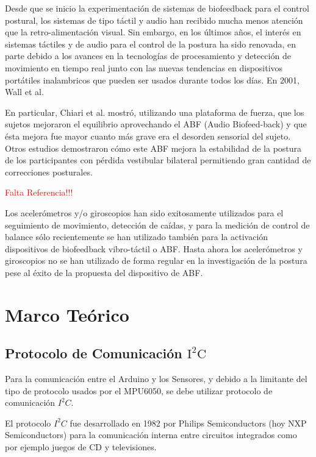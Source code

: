 \documentclass[12pt,a4paper]{article}
\begin{document}
Desde que se inicio la experimentación de sistemas de biofeedback para el control postural, los sistemas de tipo táctil y audio han recibido mucha menos atención que la retro-alimentación visual.
Sin embargo, en los últimos años, el interés en sistemas táctiles y de audio para el control de la postura ha sido renovada, en parte debido a los avances en la tecnologías de procesamiento y detección de movimiento en tiempo real junto con las nuevas tendencias en dispositivos portátiles inalambricos que pueden ser usados durante todos los días. 
En 2001, Wall et al. \cite{giansanti_energetic_2009} 

En particular, Chiari et al. mostró, utilizando una plataforma de fuerza, que los sujetos mejoraron el equilibrio aprovechando el ABF (Audio Biofeed-back) y que ésta mejora fue mayor cuanto más grave era el desorden sensorial del sujeto. Otros estudios demostraron cómo este ABF mejora la estabilidad de la postura de los participantes con pérdida vestibular bilateral permitiendo gran cantidad de correcciones posturales.

\textcolor{red}{Falta Referencia!!!}

Los acelerómetros y/o giroscopios han sido exitosamente utilizados \cite{mancini_relevance_2010} para el seguimiento de movimiento,  detección de caídas, y para la medición de control de balance sólo recientemente se han utilizado también para la activación dispositivos de biofeedback vibro-táctil o ABF. Hasta ahora los acelerómetros y giroscopios no se han utilizado de forma regular en la investigación de la postura pese al éxito de la propuesta del dispositivo de ABF.


\section{Marco Teórico}

\subsection{Protocolo de Comunicación $\mathbf{\mathrm{I^2C}}$}
Para la comunicación entre el Arduino y los Sensores, y debido a la limitante del tipo de protocolo usados por el MPU6050, se debe utilizar protocolo de comunicación $I^2C$.

El protocolo $I^2C$ fue desarrollado en 1982 por Philips Semiconductors (hoy NXP Semiconductors) para la comunicación interna entre circuitos integrados como por ejemplo juegos de CD y televisiones.
\end{document}
